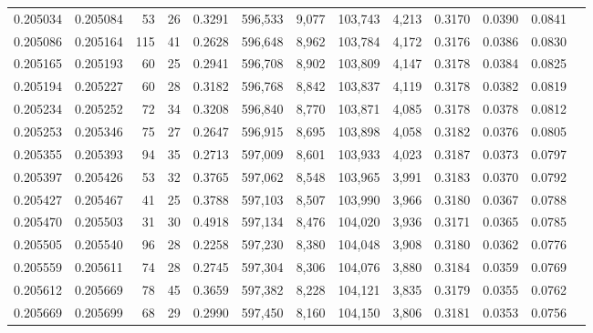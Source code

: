 \begin{tabular}{rrrrrrrrrrrrr}
0.205034 & 0.205084 &    53 &  26 &                                     0.3291 & 596,533 &   9,077 & 103,743 &   4,213 & 0.3170 & 0.0390 & 0.0841 \\
0.205086 & 0.205164 &   115 &  41 &                                     0.2628 & 596,648 &   8,962 & 103,784 &   4,172 & 0.3176 & 0.0386 & 0.0830 \\
0.205165 & 0.205193 &    60 &  25 &                                     0.2941 & 596,708 &   8,902 & 103,809 &   4,147 & 0.3178 & 0.0384 & 0.0825 \\
0.205194 & 0.205227 &    60 &  28 &                                     0.3182 & 596,768 &   8,842 & 103,837 &   4,119 & 0.3178 & 0.0382 & 0.0819 \\
0.205234 & 0.205252 &    72 &  34 &                                     0.3208 & 596,840 &   8,770 & 103,871 &   4,085 & 0.3178 & 0.0378 & 0.0812 \\
0.205253 & 0.205346 &    75 &  27 &                                     0.2647 & 596,915 &   8,695 & 103,898 &   4,058 & 0.3182 & 0.0376 & 0.0805 \\
0.205355 & 0.205393 &    94 &  35 &                                     0.2713 & 597,009 &   8,601 & 103,933 &   4,023 & 0.3187 & 0.0373 & 0.0797 \\
0.205397 & 0.205426 &    53 &  32 &                                     0.3765 & 597,062 &   8,548 & 103,965 &   3,991 & 0.3183 & 0.0370 & 0.0792 \\
0.205427 & 0.205467 &    41 &  25 &                                     0.3788 & 597,103 &   8,507 & 103,990 &   3,966 & 0.3180 & 0.0367 & 0.0788 \\
0.205470 & 0.205503 &    31 &  30 &                                     0.4918 & 597,134 &   8,476 & 104,020 &   3,936 & 0.3171 & 0.0365 & 0.0785 \\
0.205505 & 0.205540 &    96 &  28 &                                     0.2258 & 597,230 &   8,380 & 104,048 &   3,908 & 0.3180 & 0.0362 & 0.0776 \\
0.205559 & 0.205611 &    74 &  28 &                                     0.2745 & 597,304 &   8,306 & 104,076 &   3,880 & 0.3184 & 0.0359 & 0.0769 \\
0.205612 & 0.205669 &    78 &  45 &                                     0.3659 & 597,382 &   8,228 & 104,121 &   3,835 & 0.3179 & 0.0355 & 0.0762 \\
0.205669 & 0.205699 &    68 &  29 &                                     0.2990 & 597,450 &   8,160 & 104,150 &   3,806 & 0.3181 & 0.0353 & 0.0756 \\

\end{tabular}
